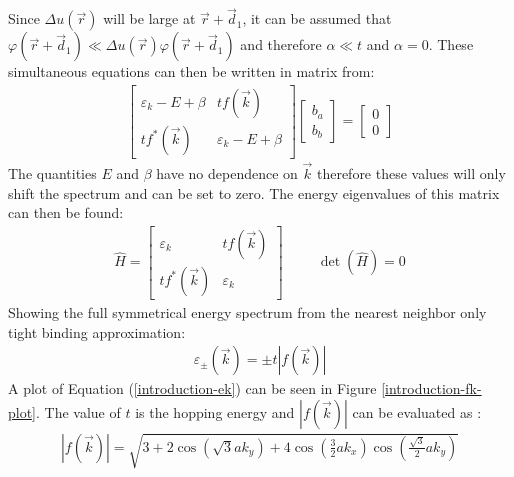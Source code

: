 			Since $\Delta u\left(\vec{r}\right)$ will be large at $\vec{r}+\vec{d}_{1}$, it can be assumed that $\varphi\left(\vec{r}+\vec{d}_{1}\right)\ll\Delta u\left(\vec{r}\right)\varphi\left(\vec{r}+\vec{d}_{1}\right)$ and therefore $\alpha\ll t$ and $\alpha=0$. These simultaneous equations can then be written in matrix from:
			\begin{align}
				\left[\begin{array}{ccc}
					\varepsilon_{k}-E+\beta&t f\left(\vec{k}\right)\\
					t f^{*}\left(\vec{k}\right)&\varepsilon_{k}-E+\beta
				\end{array}\right]
				\left[\begin{array}{ccc}
					b_{a}\\
					b_{b}	
				\end{array}\right]=
				\left[\begin{array}{ccc}
					0\\
					0
				\end{array}\right]
			\end{align}
			The quantities $E$ and $\beta$ have no dependence on $\vec{k}$ therefore these values will only shift the spectrum and can be set to zero. The energy eigenvalues of this matrix can then be found:
			\begin{align}
				\hat{H}=\left[\begin{array}{ccc}
					\varepsilon_{k}&t f\left(\vec{k}\right)\\
					t f^{*}\left(\vec{k}\right)&\varepsilon_{k}
				\end{array}\right]
				\hspace{1cm}
				\det\left(\hat{H}\right)=0
			\end{align}
			Showing the full symmetrical energy spectrum from the nearest neighbor only tight binding approximation:
			\begin{align}
				\varepsilon_{\pm}\left(\vec{k}\right)=\pm t|f\left(\vec{k}\right)|
				\label{introduction-ek}
			\end{align}
			A plot of Equation (\ref{introduction-ek}) can be seen in Figure \ref{introduction-fk-plot}. The value of $t$ is the hopping energy and $|f\left(\vec{k}\right)|$ can be evaluated as \cite{b8,b11}:
			\begin{align}
				|f\left(\vec{k}\right)|=\sqrt{3+2\cos\left(\sqrt{3}ak_{y}\right)+4\cos\left(\frac{3}{2}ak_{x}\right)\cos\left(\frac{\sqrt{3}}{2}ak_{y}\right)}
				\label{mod-fk}
			\end{align}
